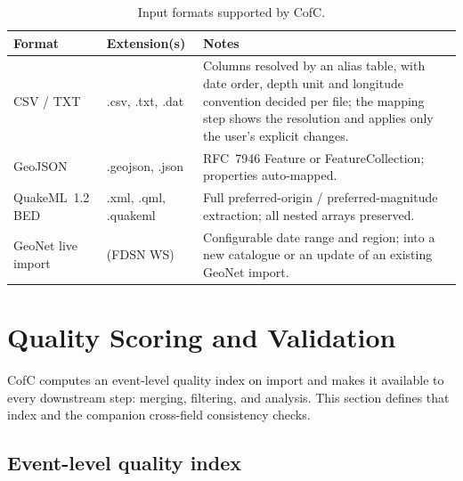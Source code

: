 \documentclass[12pt]{article}
\begin{document}
\begin{table}[ht]
\centering
\caption{Input formats supported by CofC.}
\label{tab:formats}
\begin{tabular}{@{}llp{7cm}@{}}
\toprule
\textbf{Format} & \textbf{Extension(s)} & \textbf{Notes} \\
\midrule
CSV / TXT          & .csv, .txt, .dat & Columns resolved by an alias table, with date order, depth unit and longitude convention decided per file; the mapping step shows the resolution and applies only the user's explicit changes. \\
GeoJSON            & .geojson, .json  & RFC~7946 \citep{geojson2016} Feature or FeatureCollection; properties auto-mapped. \\
QuakeML~1.2 BED    & .xml, .qml, .quakeml & Full preferred-origin / preferred-magnitude extraction; all nested arrays preserved. \\
GeoNet live import & (FDSN WS)        & Configurable date range and region; into a new catalogue or an update of an existing GeoNet import. \\
\bottomrule
\end{tabular}
\end{table}

\section{Quality Scoring and Validation}
\label{sec:quality}

CofC computes an event-level quality index on import and makes it available to
every downstream step: merging, filtering, and analysis.  This section defines
that index and the companion cross-field consistency checks.

\subsection{Event-level quality index}
\end{document}

